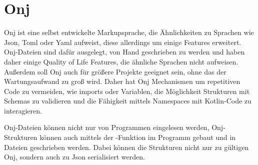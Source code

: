 
\section{Onj}\label{sec:onj}

Onj ist eine selbst entwickelte Markupsprache, die Ähnlichkeiten zu Sprachen wie Json, Toml oder Yaml aufweist,
diese allerdings um einige Features erweitert.
Onj-Dateien sind dafür ausgelegt, von Hand geschrieben zu werden und haben daher einige Quality of Life Features, die
ähnliche Sprachen nicht aufweisen.
Außerdem soll Onj auch für größere Projekte geeignet sein, ohne das der Wartungsaufwand zu groß wird.
Daher hat Onj Mechanismen um repetitiven Code zu vermeiden, wie imports oder Variablen, die Möglichkeit Strukturen
mit Schemas zu validieren und die Fähigkeit mittels Namespaces mit Kotlin-Code zu interagieren.

Onj-Dateien können nicht nur von Programmen eingelesen werden, Onj-Strukturen können auch mittels der
-Funktion im Programm gebaut und in Dateien geschrieben werden.
Dabei können die Strukturen nicht nur zu gültigen Onj, sondern auch zu Json serialisiert werden.








